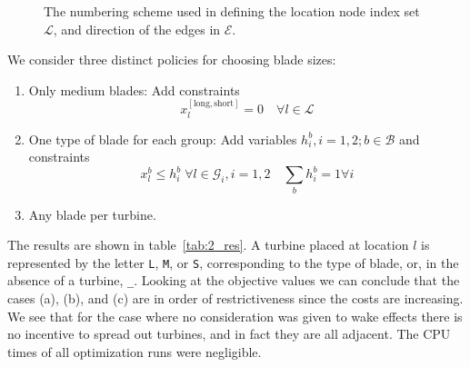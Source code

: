 \documentclass{article}
\begin{document}
\begin{figure}
	\centering
	\def\svgwidth{0.6\textwidth}
	
	\caption{The numbering scheme used in defining the location node index set $\mathcal L$, and direction of the edges in $\mathcal E$. \label{fig:loc_numbering}}
\end{figure}

We consider three distinct policies for choosing blade sizes:
\begin{enumerate}[label=(\alph*)]
	\item Only medium blades: Add constraints
		$$ x_l^{[\text{long}, \text{short}]} = 0 \quad \forall l \in \mathcal L $$
	\item One type of blade for each group:
		Add variables $h_i^b, i = 1, 2; b \in \mathcal B$ and constraints
		$$ x_l^b \le h_i^b \; \forall l \in \mathcal G_i, i = 1,2 \quad \sum_b h_i^b = 1 \forall i $$
	\item Any blade per turbine.
\end{enumerate}
The results are shown in table~\ref{tab:2_res}.
A turbine placed at location $l$ is represented
by the letter \texttt L, \texttt M, or \texttt S,
corresponding to the type of blade, or,
in the absence of a turbine, \texttt \_.
Looking at the objective values we can conclude that
the cases (a), (b), and (c) are in order of restrictiveness
since the costs are increasing.
We see that for the case where no consideration was
given to wake effects there is no incentive to spread out turbines,
and in fact they are all adjacent.
The CPU times of all optimization runs were negligible.
\end{document}

